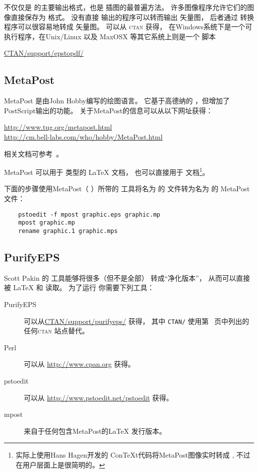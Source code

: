  不仅仅是 \pdfTeX{} 的主要输出格式，也是\pdfTeX{} 插图的最普遍方法。
许多图像程序允许它们的图像直接保存为  格式。
没有直接  输出的程序可以转而输出  矢量图，
后者通过  转换程序可以很容易地转成  矢量图。
 可以从 \textsc{ctan} 获得，
在Windows系统下是一个可执行程序，在Unix/Linux 以及 MaxOSX 等其它系统上则是一个 脚本
\begin{center}
\href{ftp://ctan.tug.org/tex-archive/support/epstopdf/}{CTAN/support/epstopdf/}
\end{center}

\subsection{MetaPost}\label{ssec:metapost}
MetaPost 是由John Hobby编写的绘图语言。
它基于高德纳的 ，但增加了PostScript输出的功能。
关于MetaPost的信息可以从以下网址获得：
\begin{center}
\url{http://www.tug.org/metapost.html}\\
\url{http://cm.bell-labs.com/who/hobby/MetaPost.html}
\end{center}
相关文档可参考~\cite{MetaPost}。

MetaPost 可以用于  类型的 \LaTeX{} 文档，
也可以直接用于 \pdfLaTeX{} 文档\footnote{
	\pdfLaTeX{} 实际上使用Hans Hagen开发的 {Con\TeX t}代码将MetaPost图像实时转成 ,
	不过在用户层面上是很简明的。}。

下面的步骤使用MetaPost（  ）所带的  工具将名为  的  文件转为名为  的 MetaPost 文件：

\begin{verbatim}
	pstoedit -f mpost graphic.eps graphic.mp
	mpost graphic.mp
	rename graphic.1 graphic.mps
\end{verbatim}

\subsection{PurifyEPS}\label{ssec:purifyeps}
Scott Pakin 的  工具能够将很多（但不是全部）  转成“净化版本”，
从而可以直接被 \LaTeX{} 和 \pdfLaTeX{} 读取。
为了运行  你需要下列工具：
\begin{description}
	\item[PurifyEPS] 可以从\href{ftp://ctan.tug.org/tex-archive/support/purifyeps/}{CTAN/support/purifyeps/} 获得，
	其中 \texttt{CTAN/} 使用第~\pageref{ctan-cite} 页中列出的任何\textsc{ctan} 站点替代。
	\item[Perl] 可以从 \url{http://www.cpan.org} 获得。
	\item[pstoedit] 可以从 \url{http://www.pstoedit.net/pstoedit} 获得。
	\item[mpost] 来自于任何包含MetaPost的\LaTeX{} 发行版本。
\end{description}


